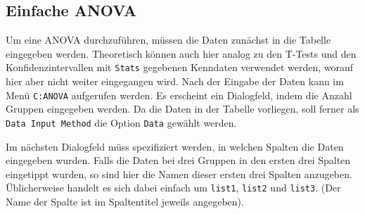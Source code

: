 \documentclass[a4paper,11pt,notitlepage,halfparskip,headsepline,normalheadings,twoside]{scrartcl}
\newlength{\tikey}
\newcommand{\keystroke}[1]{\settowidth{\tikey}{\scriptsize #1}\psframebox[framearc=0.2]{\parbox{\tikey}{\scriptsize\textsf{#1}}}}
\begin{document}
\subsection{Einfache ANOVA}
\begin{window}
Um eine ANOVA durchzuführen, müssen die Daten zunächst in die Tabelle eingegeben
werden. Theoretisch können auch hier analog zu den T-Tests und den
Konfidenzintervallen mit \texttt{Stats} gegebenen Kenndaten verwendet werden,
worauf hier aber nicht weiter eingegangen wird. Nach der Eingabe der Daten kann
im Menü \keystroke{F6} \texttt{C:ANOVA} aufgerufen werden. Es erscheint ein
Dialogfeld, indem die Anzahl Gruppen eingegeben werden. Da die Daten in der
Tabelle vorliegen, soll ferner als \texttt{Data Input Method} die Option
\texttt{Data} gewählt werden.
\end{window}

\begin{window}
Im nächsten Dialogfeld müss spezifiziert werden, in welchen Spalten die Daten
eingegeben wurden. Falls die Daten bei drei Gruppen in den ersten drei Spalten
eingetippt wurden, so sind hier die Namen dieser ersten drei Spalten anzugeben.
Üblicherweise handelt es sich dabei einfach um \texttt{list1}, \texttt{list2}
und \texttt{list3}. (Der Name der Spalte ist im Spaltentitel jeweils angegeben).
\end{window}
\end{document}

